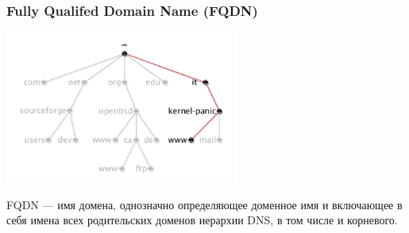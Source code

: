 
\begin{frame}[fragile]
  \frametitle{Fully Qualifed Domain Name (FQDN)}

\includegraphics[height=5cm]{../../slides/dns/images/fqdn.png}

  \begin{block}{ FQDN }
    —  имя домена, однозначно определяющее доменное имя и включающее в себя имена всех
     родительских доменов иерархии DNS, в том числе и корневого.
  \end{block}

\end{frame}